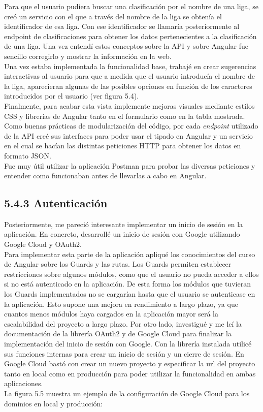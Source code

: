Para que el usuario pudiera buscar una clasificación por el nombre de una liga, se creó un servicio con el que a través del nombre de la liga se obtenía el identificador de esa liga. Con ese identificador se llamaría posteriormente al endpoint de clasificaciones para obtener los datos pertenecientes a la clasificación de una liga. Una vez entendí estos conceptos sobre la API y sobre Angular fue sencillo corregirlo y mostrar la información en la web. \\
Una vez estaba implementada la funcionalidad base, trabajé en crear sugerencias interactivas al usuario para que a medida que el usuario introducía el nombre de la liga, aparecieran algunas de las posibles opciones en función de los caracteres introducidos por el usuario (ver figura 5.4). \\
Finalmente, para acabar esta vista implemente mejoras visuales mediante estilos CSS y librerías de Angular tanto en el formulario como en la tabla mostrada. \\
Como buenas prácticas de modularización del código, por cada \textit{endpoint} utilizado de la API creé sus interfaces para poder usar el tipado en Angular y un servicio en el cual se hacían las distintas peticiones HTTP para obtener los datos en formato JSON. \\
Fue muy útil utilizar la aplicación Postman para probar las diversas peticiones y entender como funcionaban antes de llevarlas a cabo en Angular. \\

\subsection{5.4.3 Autenticación}
Posteriormente, me pareció interesante implementar un inicio de sesión en la aplicación. En concreto, desarrollé un inicio de sesión con Google utilizando Google Cloud y OAuth2. \\
Para implementar esta parte de la aplicación apliqué los conocimientos del curso de Angular sobre los Guards y las rutas. Los Guards permiten establecer restricciones sobre algunos módulos, como que el usuario no pueda acceder a ellos si no está autenticado en la aplicación. De esta forma los módulos que tuvieran los Guards implementados no se cargarían hasta que el usuario se autenticase en la aplicación. Esto supone una mejora en rendimiento a largo plazo, ya que cuantos menos módulos haya cargados en la aplicación mayor será la escalabilidad del proyecto a largo plazo. Por otro lado, investigué y me leí la documentación de la librería OAuth2 y de Google Cloud para finalizar la implementación del inicio de sesión con Google. Con la librería instalada utilicé sus funciones internas para crear un inicio de sesión y un cierre de sesión. En Google Cloud bastó con crear un nuevo proyecto y especificar la url del proyecto tanto en local como en producción para poder utilizar la funcionalidad en ambas aplicaciones. \\
La figura 5.5 muestra un ejemplo de la configuración de Google Cloud para los dominios en local y producción:


